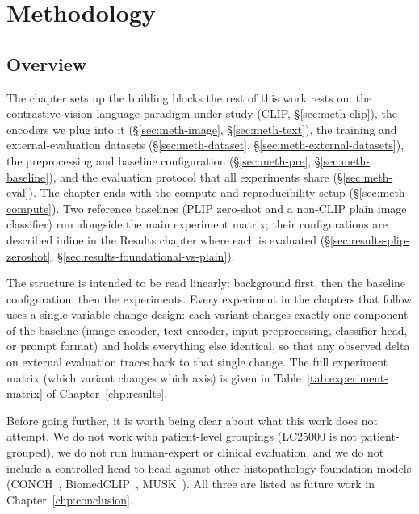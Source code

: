 \chapter{Methodology}\label{chp:methodology}

\section{Overview}
\label{sec:meth-overview}

The chapter sets up the building blocks the rest of this work rests on: the contrastive vision-language paradigm under study (CLIP, §\ref{sec:meth-clip}), the encoders we plug into it (§\ref{sec:meth-image}, §\ref{sec:meth-text}), the training and external-evaluation datasets (§\ref{sec:meth-dataset}, §\ref{sec:meth-external-datasets}), the preprocessing and baseline configuration (§\ref{sec:meth-pre}, §\ref{sec:meth-baseline}), and the evaluation protocol that all experiments share (§\ref{sec:meth-eval}). The chapter ends with the compute and reproducibility setup (§\ref{sec:meth-compute}). Two reference baselines (PLIP zero-shot and a non-CLIP plain image classifier) run alongside the main experiment matrix; their configurations are described inline in the Results chapter where each is evaluated (§\ref{sec:results-plip-zeroshot}, §\ref{sec:results-foundational-vs-plain}).

The structure is intended to be read linearly: background first, then the baseline configuration, then the experiments. Every experiment in the chapters that follow uses a single-variable-change design: each variant changes exactly one component of the baseline (image encoder, text encoder, input preprocessing, classifier head, or prompt format) and holds everything else identical, so that any observed delta on external evaluation traces back to that single change. The full experiment matrix (which variant changes which axis) is given in Table~\ref{tab:experiment-matrix} of Chapter~\ref{chp:results}.

Before going further, it is worth being clear about what this work does not attempt. We do not work with patient-level groupings (LC25000 is not patient-grouped), we do not run human-expert or clinical evaluation, and we do not include a controlled head-to-head against other histopathology foundation models (CONCH~\cite{lu2024conch}, BiomedCLIP~\cite{zhang2023biomedclip}, MUSK~\cite{xiang2025musk}). All three are listed as future work in Chapter~\ref{chp:conclusion}.


